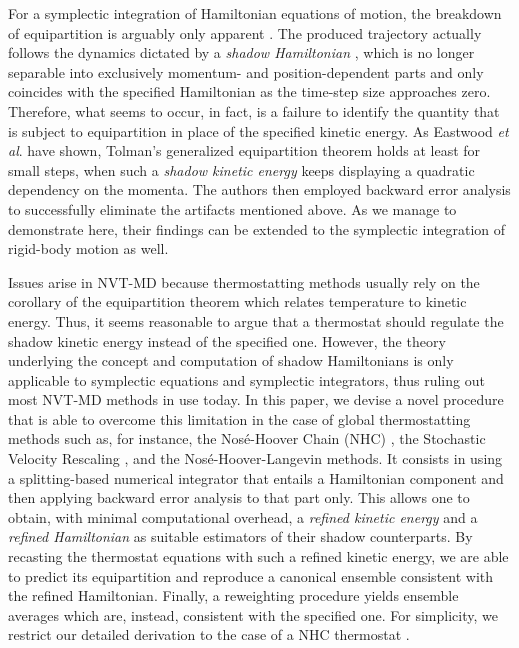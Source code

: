 \documentclass[
	aip,
	jcp,
	reprint,
]{revtex4-1}
\begin{document}
For a symplectic integration of Hamiltonian equations of motion, the breakdown of equipartition is arguably only apparent \cite{Eastwood_2010}.
The produced trajectory actually follows the dynamics dictated by a \textit{shadow Hamiltonian} \cite{Tuckerman_2010}, which is no longer separable into exclusively momentum- and position-dependent parts and only coincides with the specified Hamiltonian as the time-step size approaches zero.
Therefore, what seems to occur, in fact, is a failure to identify the quantity that is subject to equipartition in place of the specified kinetic energy.
As Eastwood \textit{et al}. \cite{Eastwood_2010} have shown, Tolman's generalized equipartition theorem \cite{Tolman_1918} holds at least for small steps, when such a \textit{shadow kinetic energy} keeps displaying a quadratic dependency on the momenta.
The authors then employed backward error analysis to successfully eliminate the artifacts mentioned above.
As we manage to demonstrate here, their findings can be extended to the symplectic integration of rigid-body motion as well.

Issues arise in NVT-MD because thermostatting methods usually rely on the corollary of the equipartition theorem which relates temperature to kinetic energy.
Thus, it seems reasonable to argue that a thermostat should regulate the shadow kinetic energy instead of the specified one.
However, the theory underlying the concept and computation of shadow Hamiltonians is only applicable to symplectic equations and symplectic integrators, thus ruling out most NVT-MD methods in use today.
In this paper, we devise a novel procedure that is able to overcome this limitation in the case of global thermostatting methods such as, for instance, the Nos\'{e}-Hoover Chain (NHC) \cite{Martyna_1992}, the Stochastic Velocity Rescaling \cite{Bussi_2007}, and the Nos\'{e}-Hoover-Langevin \cite{Samoletov_2007, Leimkuhler_2009} methods.
It consists in using a splitting-based numerical integrator that entails a Hamiltonian component and then applying backward error analysis to that part only.
This allows one to obtain, with minimal computational overhead, a \textit{refined kinetic energy} and a \textit{refined Hamiltonian} as suitable estimators of their shadow counterparts.
By recasting the thermostat equations with such a refined kinetic energy, we are able to predict its equipartition and reproduce a canonical ensemble consistent with the refined Hamiltonian.
Finally, a reweighting procedure yields ensemble averages which are, instead, consistent with the specified one.
For simplicity, we restrict our detailed derivation to the case of a NHC thermostat \cite{Martyna_1992}.
\end{document}
